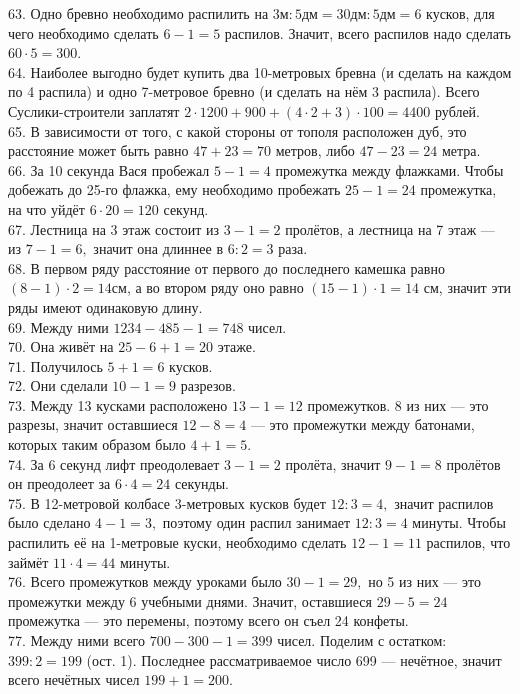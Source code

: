 \documentclass[12pt]{article}
\begin{document}
63. Одно бревно необходимо распилить на $3\text{м}:5\text{дм}=30\text{дм}:5\text{дм}=6$ кусков, для чего необходимо сделать $6-1=5$ распилов. Значит, всего распилов надо сделать $60\cdot5=300.$\\
64. Наиболее выгодно будет купить два 10-метровых бревна (и сделать на каждом по 4 распила) и одно 7-метровое бревно (и сделать на нём 3 распила). Всего Суслики-строители заплатят $2\cdot1200+900+(4\cdot2+3)\cdot100=4400$ рублей.\\
65. В зависимости от того, с какой стороны от тополя расположен дуб, это расстояние может быть равно $47+23=70$ метров, либо $47-23=24$ метра.\\
66. За 10 секунда Вася пробежал $5-1=4$ промежутка между флажками. Чтобы добежать до 25-го флажка, ему необходимо пробежать $25-1=24$ промежутка, на что уйдёт $6\cdot20=120$ секунд.\\
67. Лестница на 3 этаж состоит из $3-1=2$ пролётов, а лестница на 7 этаж --- из $7-1=6,$ значит она длиннее в $6:2=3$ раза.\\
68. В первом ряду расстояние от первого до последнего камешка равно $(8-1)\cdot2=14$см, а во втором ряду оно равно $(15-1)\cdot1=14$ см, значит эти ряды имеют одинаковую длину.\\
69. Между ними $1234-485-1=748$ чисел.\\
70. Она живёт на $25-6+1=20$ этаже.\\
71. Получилось $5+1=6$ кусков.\\
72. Они сделали $10-1=9$ разрезов.\\
73. Между 13 кусками расположено $13-1=12$ промежутков. 8 из них --- это разрезы, значит оставшиеся $12-8=4$ --- это промежутки между батонами, которых таким образом было $4+1=5.$\\
74. За 6 секунд лифт преодолевает $3-1=2$ пролёта, значит $9-1=8$ пролётов он преодолеет за $6\cdot4=24$ секунды.\\
75. В 12-метровой колбасе 3-метровых кусков будет $12:3=4,$ значит распилов было сделано $4-1=3,$ поэтому один распил занимает $12:3=4$ минуты. Чтобы распилить её на 1-метровые куски, необходимо сделать $12-1=11$ распилов, что займёт $11\cdot4=44$ минуты.\\
76. Всего промежутков между уроками было $30-1=29,$ но 5 из них --- это промежутки между 6 учебными днями. Значит, оставшиеся $29-5=24$ промежутка --- это перемены, поэтому всего он съел 24 конфеты.\\
77. Между ними всего $700-300-1=399$ чисел. Поделим с остатком: $399:2=199$ (ост. 1). Последнее рассматриваемое число 699 --- нечётное, значит всего нечётных чисел $199+1=200.$\\
\end{document}
